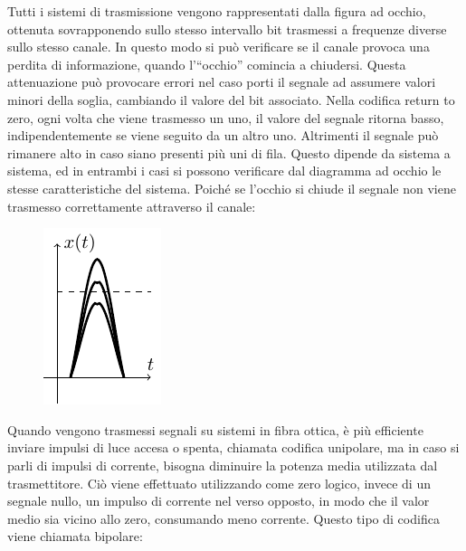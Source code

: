 \documentclass{article}
\numberwithin{equation}{subsection}
\begin{document}
Tutti i sistemi di trasmissione vengono rappresentati dalla figura ad occhio, ottenuta sovrapponendo sullo stesso intervallo bit trasmessi a frequenze diverse sullo 
stesso canale. In questo modo si può verificare se il canale provoca una perdita di informazione, quando l'``occhio'' comincia a chiudersi. Questa attenuazione può 
provocare errori nel caso porti il 
segnale ad assumere valori minori della soglia, cambiando il valore del bit associato. 
Nella codifica return to zero, ogni volta che viene trasmesso un uno, il valore del segnale ritorna basso, indipendentemente se viene seguito da un altro uno. Altrimenti 
il segnale può rimanere alto in caso siano presenti più uni di fila. Questo dipende da sistema a sistema, ed in entrambi i casi si possono verificare dal diagramma ad occhio 
le stesse caratteristiche del sistema. Poiché se l'occhio si chiude il segnale non viene trasmesso correttamente attraverso il canale:
\begin{figure}[H]%
    \centering
    \includegraphics{diagramma-occhio.pdf}%
\end{figure}    
Quando vengono trasmessi segnali su sistemi in fibra ottica, è più efficiente inviare impulsi di luce accesa o spenta, chiamata codifica unipolare, ma in caso si parli di impulsi di corrente, 
bisogna diminuire la potenza media utilizzata dal trasmettitore. Ciò viene effettuato utilizzando come zero logico, invece di un segnale nullo, un impulso di corrente nel 
verso opposto, in modo che il valor medio sia vicino allo zero, consumando meno corrente. Questo tipo di codifica viene chiamata bipolare:
\end{document}
